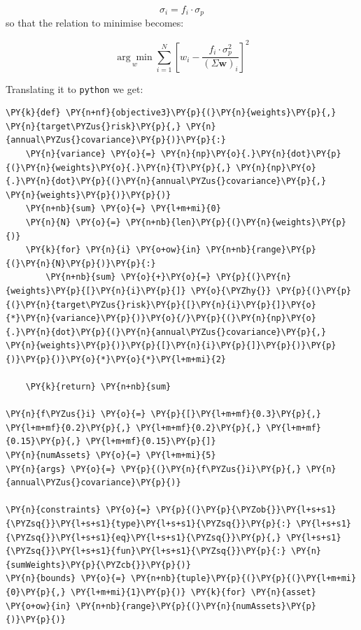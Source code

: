 \[ \sigma _{i}=f_i \cdot \sigma_p \]
so that the relation to minimise becomes:

\[ \underset{w}{\arg \min } \sum _{i=1}^{N}\left[w_{i}-{\frac {f_i \cdot \sigma_p^{2}}{(\Sigma \mathbf{w})_{i}}}\right]^{2} \]

Translating it to \texttt{python} we get:

    \begin{tcolorbox}[breakable, size=fbox, boxrule=1pt, pad at break*=1mm,colback=cellbackground, colframe=cellborder]
\begin{Verbatim}[commandchars=\\\{\}]
\PY{k}{def} \PY{n+nf}{objective3}\PY{p}{(}\PY{n}{weights}\PY{p}{,} \PY{n}{target\PYZus{}risk}\PY{p}{,} \PY{n}{annual\PYZus{}covariance}\PY{p}{)}\PY{p}{:}
    \PY{n}{variance} \PY{o}{=} \PY{n}{np}\PY{o}{.}\PY{n}{dot}\PY{p}{(}\PY{n}{weights}\PY{o}{.}\PY{n}{T}\PY{p}{,} \PY{n}{np}\PY{o}{.}\PY{n}{dot}\PY{p}{(}\PY{n}{annual\PYZus{}covariance}\PY{p}{,} \PY{n}{weights}\PY{p}{)}\PY{p}{)}
    \PY{n+nb}{sum} \PY{o}{=} \PY{l+m+mi}{0}
    \PY{n}{N} \PY{o}{=} \PY{n+nb}{len}\PY{p}{(}\PY{n}{weights}\PY{p}{)}
    \PY{k}{for} \PY{n}{i} \PY{o+ow}{in} \PY{n+nb}{range}\PY{p}{(}\PY{n}{N}\PY{p}{)}\PY{p}{:}
        \PY{n+nb}{sum} \PY{o}{+}\PY{o}{=} \PY{p}{(}\PY{n}{weights}\PY{p}{[}\PY{n}{i}\PY{p}{]} \PY{o}{\PYZhy{}} \PY{p}{(}\PY{p}{(}\PY{n}{target\PYZus{}risk}\PY{p}{[}\PY{n}{i}\PY{p}{]}\PY{o}{*}\PY{n}{variance}\PY{p}{)}\PY{o}{/}\PY{p}{(}\PY{n}{np}\PY{o}{.}\PY{n}{dot}\PY{p}{(}\PY{n}{annual\PYZus{}covariance}\PY{p}{,} \PY{n}{weights}\PY{p}{)}\PY{p}{[}\PY{n}{i}\PY{p}{]}\PY{p}{)}\PY{p}{)}\PY{p}{)}\PY{o}{*}\PY{o}{*}\PY{l+m+mi}{2}
        
    \PY{k}{return} \PY{n+nb}{sum}

\PY{n}{f\PYZus{}i} \PY{o}{=} \PY{p}{[}\PY{l+m+mf}{0.3}\PY{p}{,} \PY{l+m+mf}{0.2}\PY{p}{,} \PY{l+m+mf}{0.2}\PY{p}{,} \PY{l+m+mf}{0.15}\PY{p}{,} \PY{l+m+mf}{0.15}\PY{p}{]}
\PY{n}{numAssets} \PY{o}{=} \PY{l+m+mi}{5}
\PY{n}{args} \PY{o}{=} \PY{p}{(}\PY{n}{f\PYZus{}i}\PY{p}{,} \PY{n}{annual\PYZus{}covariance}\PY{p}{)}

\PY{n}{constraints} \PY{o}{=} \PY{p}{(}\PY{p}{\PYZob{}}\PY{l+s+s1}{\PYZsq{}}\PY{l+s+s1}{type}\PY{l+s+s1}{\PYZsq{}}\PY{p}{:} \PY{l+s+s1}{\PYZsq{}}\PY{l+s+s1}{eq}\PY{l+s+s1}{\PYZsq{}}\PY{p}{,} \PY{l+s+s1}{\PYZsq{}}\PY{l+s+s1}{fun}\PY{l+s+s1}{\PYZsq{}}\PY{p}{:} \PY{n}{sumWeights}\PY{p}{\PYZcb{}}\PY{p}{)}
\PY{n}{bounds} \PY{o}{=} \PY{n+nb}{tuple}\PY{p}{(}\PY{p}{(}\PY{l+m+mi}{0}\PY{p}{,} \PY{l+m+mi}{1}\PY{p}{)} \PY{k}{for} \PY{n}{asset} \PY{o+ow}{in} \PY{n+nb}{range}\PY{p}{(}\PY{n}{numAssets}\PY{p}{)}\PY{p}{)}


\end{Verbatim}
\end{tcolorbox}
